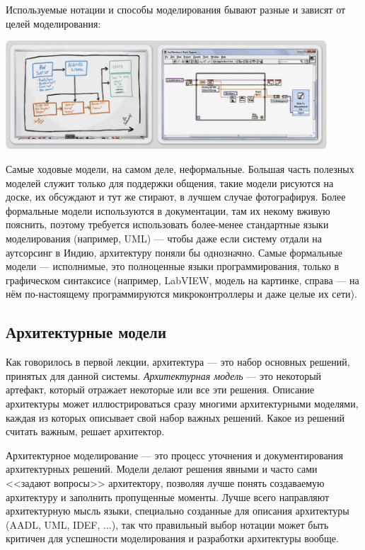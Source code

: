 \documentclass{../text-style}
\begin{document}
Используемые нотации и способы моделирования бывают разные и зависят от целей моделирования:

\begin{center}
    \includegraphics[width=0.9\textwidth]{sketchesVsFormalNotations.png}
\end{center}

Самые ходовые модели, на самом деле, неформальные. Большая часть полезных моделей служит только для поддержки общения, такие модели рисуются на доске, их обсуждают и тут же стирают, в лучшем случае фотографируя. Более формальные модели используются в документации, там их некому вживую пояснить, поэтому требуется использовать более-менее стандартные языки моделирования (например, UML) --- чтобы даже если систему отдали на аутсорсинг в Индию, архитектуру поняли бы однозначно. Самые формальные модели --- исполнимые, это полноценные языки программирования, только в графическом синтаксисе (например, LabVIEW, модель на картинке, справа --- на нём по-настоящему программируются микроконтроллеры и даже целые их сети).

\subsection{Архитектурные модели}

Как говорилось в первой лекции, архитектура --- это набор основных решений, принятых для данной системы. \textit{Архитектурная модель} --- это некоторый артефакт, который отражает некоторые или все эти решения. Описание архитектуры может иллюстрироваться сразу многими архитектурными моделями, каждая из которых описывает свой набор важных решений. Какое из решений считать важным, решает архитектор.

Архитектурное моделирование --- это процесс уточнения и документирования архитектурных решений. Модели делают решения явными и часто сами <<задают вопросы>> архитектору, позволяя лучше понять создаваемую архитектуру и заполнить пропущенные моменты. Лучше всего направляют архитектурную мысль языки, специально созданные для описания архитектуры (AADL, UML, IDEF, ...), так что правильный выбор нотации может быть критичен для успешности моделирования и разработки архитектуры вообще.
\end{document}

